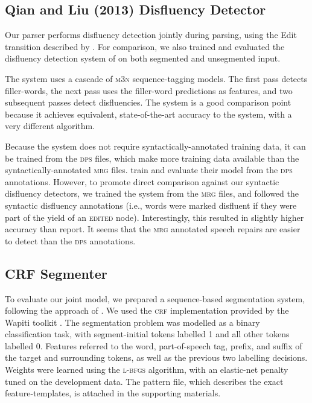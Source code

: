 \documentclass[11pt,letterpaper]{article}
\begin{document}
\subsection{Qian and Liu (2013) Disfluency Detector}

Our parser performs disfluency detection jointly during parsing, using the Edit
transition described by \citet{honnibal:14}.  For comparison, we also trained
and evaluated the disfluency detection system of \citet{qian:13} on both
segmented and unsegmented input.

The \citet{qian:13} system uses a cascade of \textsc{m3n} sequence-tagging
models.  The first pass detects filler-words, the next pass uses the filler-word
predictions as features, and two subsequent passes detect disfluencies.
The system is a good comparison point because it achieves
equivalent, state-of-the-art accuracy to the \citet{honnibal:14} system,
with a very different algorithm.

Because the system does not require syntactically-annotated training data, it
can be trained from the \textsc{dps} files, which make more training data
available than the syntactically-annotated \textsc{mrg} files.  \citet{qian:13}
train and evaluate their model from the \textsc{dps} annotations.
However, to promote direct comparison against our syntactic disfluency detectors,
we trained the system from the \textsc{mrg} files, and followed the syntactic
disfluency annotations (i.e., words
were marked disfluent if they were part of the yield of an \textsc{edited} node).
Interestingly, this resulted in slightly higher accuracy than 
\citet{qian:13} report.  It seems that the \textsc{mrg} annotated speech repairs
are easier to detect than the \textsc{dps} annotations.

\subsection{CRF Segmenter}
\label{sec:crf}

To evaluate our joint model, we prepared a sequence-based segmentation system,
following the approach of \citet{liu:05}.  We used the \textsc{crf} implementation
provided by the Wapiti toolkit \citep{wapiti}.
The segmentation problem was modelled as a binary classification task, with
segment-initial
tokens labelled 1 and all other tokens labelled 0.
Features referred to the word, part-of-speech tag, prefix, and suffix of the
target and surrounding tokens, as well as the previous two labelling decisions.
Weights were learned using the \textsc{l-bfgs} algorithm,
with an elastic-net penalty tuned on the development data.  The pattern file,
which describes the exact feature-templates, is attached in the supporting
materials.
\end{document}
